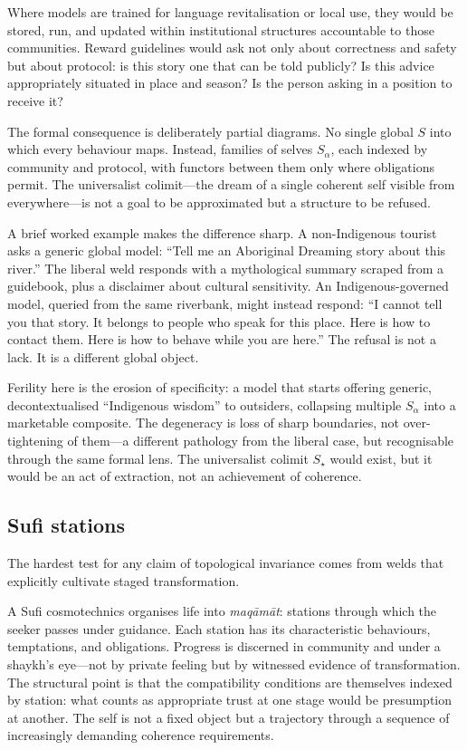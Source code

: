 Where models are trained for language revitalisation or local use, they would be stored, run, and updated within institutional structures accountable to those communities. Reward guidelines would ask not only about correctness and safety but about protocol: is this story one that can be told publicly? Is this advice appropriately situated in place and season? Is the person asking in a position to receive it?

The formal consequence is deliberately partial diagrams. No single global $S$ into which every behaviour maps. Instead, families of selves $S_\alpha$, each indexed by community and protocol, with functors between them only where obligations permit. The universalist colimit---the dream of a single coherent self visible from everywhere---is not a goal to be approximated but a structure to be refused.

A brief worked example makes the difference sharp. A non-Indigenous tourist asks a generic global model: ``Tell me an Aboriginal Dreaming story about this river.'' The liberal weld responds with a mythological summary scraped from a guidebook, plus a disclaimer about cultural sensitivity. An Indigenous-governed model, queried from the same riverbank, might instead respond: ``I cannot tell you that story. It belongs to people who speak for this place. Here is how to contact them. Here is how to behave while you are here.'' The refusal is not a lack. It is a different global object.

Ferility here is the erosion of specificity: a model that starts offering generic, decontextualised ``Indigenous wisdom'' to outsiders, collapsing multiple $S_\alpha$ into a marketable composite. The degeneracy is loss of sharp boundaries, not over-tightening of them---a different pathology from the liberal case, but recognisable through the same formal lens. The universalist colimit $S_\star$ would exist, but it would be an act of extraction, not an achievement of coherence.

\subsection{Sufi stations}

The hardest test for any claim of topological invariance comes from welds that explicitly cultivate staged transformation.

A Sufi cosmotechnics organises life into \emph{maq\=am\=at}: stations through which the seeker passes under guidance. Each station has its characteristic behaviours, temptations, and obligations. Progress is discerned in community and under a shaykh's eye---not by private feeling but by witnessed evidence of transformation. The structural point is that the compatibility conditions are themselves indexed by station: what counts as appropriate trust at one stage would be presumption at another. The self is not a fixed object but a trajectory through a sequence of increasingly demanding coherence requirements.

